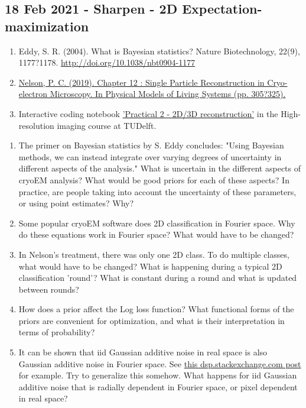 \documentclass[11pt, oneside]{article}   	%
\begin{document}
\subsection{18 Feb 2021 - Sharpen - 2D Expectation-maximization}
\begin{enumerate}
	\item Eddy, S. R. (2004). What is Bayesian statistics? Nature Biotechnology, 22(9), 1177?1178. \url{http://doi.org/10.1038/nbt0904-1177}
	\item \href{https://repository.upenn.edu/cgi/viewcontent.cgi?article=1665&context=physics_papers}{Nelson, P. C. (2019). Chapter 12 : Single Particle Reconstruction in Cryo-electron Microscopy. In Physical Models of Living Systems (pp. 305?325).}
	\item Interactive coding notebook \href{https://gitlab.tudelft.nl/aj-lab/teaching/-/wikis/NB4020}{'Practical 2 - 2D/3D reconstruction'} in the High-resolution imaging course at TUDelft.
\end{enumerate}
\begin{enumerate}
	\item The primer on Bayesian statistics by S. Eddy concludes: "Using Bayesian methods, we can instead integrate over varying degrees of uncertainty in different aspects of the analysis." What is uncertain in the different aspects of cryoEM analysis? What would be good priors for each of these aspects? In practice, are people taking into account the uncertainty of these parameters, or using point estimates? Why?
	\item Some popular cryoEM software does 2D classification in Fourier space. Why do these equations work in Fourier space? What would have to be changed?
	\item In Nelson's treatment, there was only one 2D class. To do multiple classes, what would have to be changed? What is happening during a typical 2D classification 'round'? What is constant during a round and what is updated between rounds?
	\item How does a prior affect the Log loss function? What functional forms of the priors are convenient for optimization, and what is their interpretation in terms of probability?
	\item It can be shown that iid Gaussian additive noise in real space is also Gaussian additive noise in Fourier space. See \href{https://dsp.stackexchange.com/questions/24170/what-are-the-statistics-of-the-discrete-fourier-transform-of-white-gaussian-nois}{this dsp.stackexchange.com post} for example. Try to generalize this somehow. What happens for iid Gaussian additive noise that is radially dependent in Fourier space, or pixel dependent in real space?
\end{enumerate}
\end{document}
